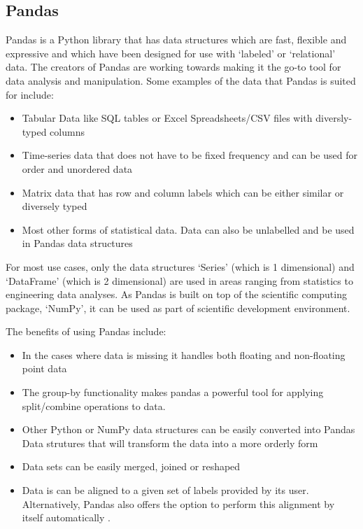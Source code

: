 \subsection{Pandas}
Pandas is a Python library that has data structures which are fast, flexible and expressive and which have been designed for use with ‘labeled’ or ‘relational’ data. The creators of Pandas are working towards making it the go-to tool for data analysis and manipulation. Some examples of the data that Pandas is suited for include:
\begin{itemize}
	\item Tabular Data like SQL tables or Excel Spreadsheets/CSV files with diversly-typed columns
	\item Time-series data that does not have to be fixed frequency and can be used for order and unordered data
	\item Matrix data that has row and column labels which can be either similar or diversely typed
	\item Most other forms of statistical data. Data can also be unlabelled and be used in Pandas data structures
\end{itemize}
For most use cases, only the data structures ‘Series’ (which is 1 dimensional) and ‘DataFrame’ (which is 2 dimensional) are used in areas ranging from statistics to engineering data analyses. 
As Pandas is built on top of the scientific computing package, ‘NumPy’, it can be used as part of scientific development environment.

The benefits of using Pandas include:
\begin{itemize}
	\item In the cases where data is missing it handles both floating and non-floating point data
	\item The group-by functionality makes pandas a powerful tool for applying split/combine operations to data.
	\item Other Python or NumPy data structures can be easily converted into Pandas Data strutures that will transform the data into a more orderly form
	\item Data sets can be easily merged, joined or reshaped
	\item Data is can be aligned to a given set of labels provided by its user. Alternatively, Pandas also offers the option to perform this alignment by itself automatically \cite{pandas}.
\end{itemize}

